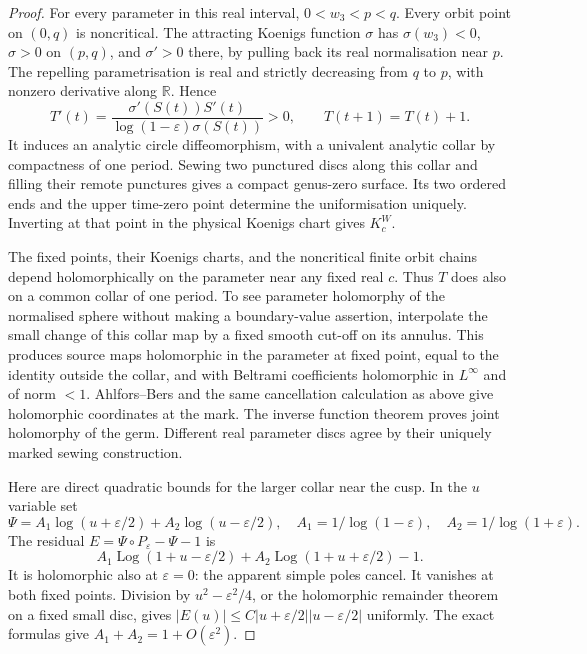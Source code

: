 \documentclass[11pt]{article}
\newcommand{\Log}{\operatorname{Log}}
\begin{document}
\begin{proof}
For every parameter in this real interval, $0<w_3<p<q$.
Every orbit point on $(0,q)$ is noncritical. The attracting Koenigs
function $\sigma$ has $\sigma(w_3)<0$, $\sigma>0$ on $(p,q)$,
and $\sigma'>0$ there, by pulling back its real normalisation near $p$.
The repelling parametrisation is real and strictly decreasing from
$q$ to $p$, with nonzero derivative along $\mathbb R$.
Hence
\[
 T'(t)=\frac{\sigma'(S(t))S'(t)}{\log(1-\varepsilon)\sigma(S(t))}>0,
 \qquad T(t+1)=T(t)+1.
\]
It induces an analytic circle diffeomorphism, with a univalent analytic
collar by compactness of one period. Sewing two punctured discs along
this collar and filling their remote punctures gives a compact genus-zero
surface. Its two ordered ends and the upper time-zero point determine
the uniformisation uniquely. Inverting at that point in the physical
Koenigs chart gives $K_c^W$.

The fixed points, their Koenigs charts, and the noncritical finite orbit
chains depend holomorphically on the parameter near any fixed real $c$.
Thus $T$ does also on a common collar of one period. To see parameter
holomorphy of the normalised sphere without making a boundary-value
assertion, interpolate the small change of this collar map by a fixed
smooth cut-off on its annulus. This produces source maps holomorphic
in the parameter at fixed point, equal to the identity outside the
collar, and with Beltrami coefficients holomorphic in $L^\infty$ and
of norm $<1$. Ahlfors--Bers and the same cancellation calculation as
above give holomorphic coordinates at the mark. The inverse function
theorem proves joint holomorphy of the germ. Different real parameter
discs agree by their uniquely marked sewing construction.

Here are direct quadratic bounds for the larger collar near the cusp.
In the $u$ variable set
\[
 \Psi=A_1\log(u+\varepsilon/2)+A_2\log(u-\varepsilon/2),
 \quad A_1=1/\log(1-\varepsilon),\quad A_2=1/\log(1+\varepsilon).
\]
The residual $E=\Psi\circ P_\varepsilon-\Psi-1$ is
\[
 A_1\Log(1+u-\varepsilon/2)
 +A_2\Log(1+u+\varepsilon/2)-1.
\]
It is holomorphic also at $\varepsilon=0$: the apparent simple poles
cancel. It vanishes at both fixed points. Division by
$u^2-\varepsilon^2/4$, or the holomorphic remainder theorem on a
fixed small disc, gives
$|E(u)|\le C|u+\varepsilon/2||u-\varepsilon/2|$ uniformly.
The exact formulas give $A_1+A_2=1+O(\varepsilon^2)$.


\end{proof}
\end{document}
